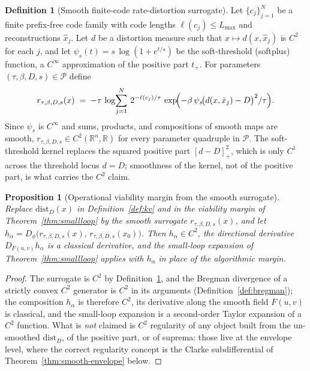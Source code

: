 \documentclass[11pt,a4paper]{article}
\theoremstyle{plain}
\newtheorem{proposition}[theorem]{Proposition}
\theoremstyle{definition}
\newtheorem{definition}[theorem]{Definition}
\theoremstyle{remark}
\newcommand{\RR}{\mathbb{R}}
\newcommand{\distD}{\mathrm{dist}_{D}}
\begin{document}
\begin{definition}[Smooth finite-code rate-distortion surrogate]
\label{def:ard-surrogate}
Let $\{c_j\}_{j=1}^N$ be a finite prefix-free code family with code
lengths $\ell(c_j) \le L_{\max}$ and reconstructions $\hat x_j$. Let
$d$ be a distortion measure such that $x \mapsto d(x, \hat x_j)$ is
$C^2$ for each $j$, and let $\psi_s(t) = s\,\log(1 + e^{t/s})$ be the
soft-threshold (softplus) function, a $C^\infty$ approximation of
the positive part $t_+$. For parameters $(\tau, \beta, D, s) \in
\mathcal{P}$ define
\begin{equation}\label{eq:ard-surrogate}
  r_{\tau,\beta,D,s}(x) \;=\; -\tau\,\log\!\sum_{j=1}^{N}\,
  2^{-\ell(c_j)/\tau}\,
  \exp\!\Bigl(-\beta\,\psi_s\!\bigl(d(x, \hat x_j) - D\bigr)^{2}/\tau\Bigr).
\end{equation}
Since $\psi_s$ is $C^\infty$ and sums, products, and compositions of
smooth maps are smooth, $r_{\tau,\beta,D,s} \in C^2(\RR^n, \RR)$ for
every parameter quadruple in $\mathcal{P}$. The soft-threshold kernel
replaces the squared positive part $[d - D]_+^2$, which is only $C^1$
across the threshold locus $d = D$; smoothness of the kernel, not of
the positive part, is what carries the $C^2$ claim.
\end{definition}

\begin{proposition}[Operational viability margin from the smooth
surrogate]\label{prop:ard-surrogate}
Replace $\distD(x)$ in Definition~\ref{def:kv} and in the viability
margin of Theorem~\ref{thm:smallloop} by the smooth surrogate
$r_{\tau,\beta,D,s}(x)$, and let $h_\alpha = D_\phi\bigl(
r_{\tau,\beta,D,s}(x),\, r_{\tau,\beta,D,s}(x_0)\bigr)$. Then
$h_\alpha \in C^2$, the directional derivative
$D_{F(u,v)} h_\alpha$ is a classical derivative, and the small-loop
expansion of Theorem~\ref{thm:smallloop} applies with $h_\alpha$ in
place of the algorithmic margin.
\end{proposition}

\begin{proof}
The surrogate is $C^2$ by Definition~\ref{def:ard-surrogate}, and the
Bregman divergence of a strictly convex $C^2$ generator is $C^2$ in
its arguments (Definition~\ref{def:bregman}); the composition
$h_\alpha$ is therefore $C^2$, its derivative along the smooth field
$F(u,v)$ is classical, and the small-loop expansion is a
second-order Taylor expansion of a $C^2$ function. What is
\emph{not} claimed is $C^2$ regularity of any object built from the
un-smoothed $\distD$, of the positive part, or of suprema: those
live at the envelope level, where the correct regularity concept is
the Clarke subdifferential of Theorem~\ref{thm:smooth-envelope}
below.
\end{proof}
\end{document}
